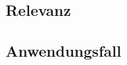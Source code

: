 %
\subsection{Relevanz}
\label{chap:relevanz}

%
\subsection{Anwendungsfall}
\label{chap:anwendungsfall}
